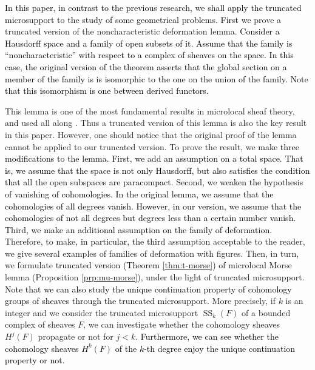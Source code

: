 ﻿\documentclass[a4paper,leqno,dvipdfmx]{jsarticle}
\theoremstyle{definition}
\numberwithin{equation}{section}
\newcommand{\muS}[1][]{\mathop{\mathrm{SS}}\nolimits_{#1}}
\theoremstyle{mystyle}
\begin{document}

\textcolor{black}
{In this paper, 
in contrast to the previous research, 
we shall apply the truncated microsupport 
to \textcolor{black}{the study of} some geometrical problems. 
First we} prove a truncated version of 
the noncharacteristic deformation lemma. 
\textcolor{black}
{Consider a Hausdorff space and a family of open subsets of it. 
Assume that the family is ``noncharacteristic'' with 
respect to a complex of sheaves on the space.
In this case, 
the original version of the theorem asserts that 
the global section on a member of the family is 
is isomorphic to the one on the union of the family. 
Note that this isomorphism is one between derived functors.}

This lemma is one of the most fundamental 
result\textcolor{black}{s} 
in microlocal sheaf theory, \textcolor{black}{and} 
used all along \cite{KS90}. 
Thus a truncated version of this lemma 
is also the key result in this paper. 
However, one should notice that 
the original proof of the lemma cannot be applied 
to our truncated version. 
To prove \textcolor{black}{the} result, 
we \textcolor{black}{make three modifications 
to the lemma. 
First, we add an assumption on a total space. 
That is, 
we assume that the space is not only Hausdorff, but also 
satisfies the condition that 
all the open subspaces are paracompact.} 
\textcolor{black}{Second, we weaken the hypothesis of vanishing of 
cohomologies. In the original lemma, we assume that 
the cohomologies of all degrees vanish. However, in our version, 
we assume that the cohomologies of not all degrees 
but degrees less than a certain number vanish.} 
\textcolor{black}{Third, we make an additional assumption on 
the family of deformation.}
Therefore, 
to make\textcolor{black}{, in particular, the third} 
assumption acceptable to the reader, 
we give several examples of families of deformation with figures. 
Then, in turn, we formulate 
\textcolor{black}{truncated version (Theorem \ref{thm:t-morse}) of} 
microlocal \textcolor{black}{M}orse lemma (Proposition \ref{prp:mu-morse}), 
under the light of truncated microsupport. 
\textcolor{black}
{Note that we can also study 
the unique continuation property of 
cohomology groups of sheaves 
through the truncated microsupport.}
More precisely, if \(k\) is an integer and 
we consider the truncated microsupport \(\muS[k](F)\) of 
a bounded complex of sheaves \(F\), 
we can investigate whether 
the cohomology sheaves \(H^{j}(F)\) propagate or not for \(j<k\).
\textcolor{black}
{Furthermore, we can see 
whether the cohomology sheaves \(H^k(F)\) of the \(k\)-th degree 
enjoy the unique continuation property or not.}
\end{document}

